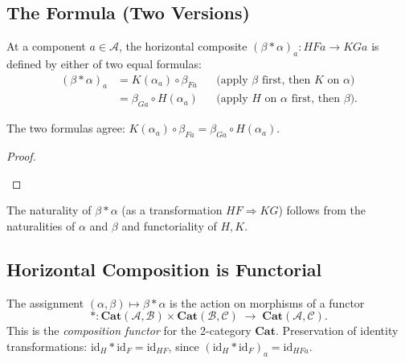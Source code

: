 \subsection{The Formula (Two Versions)}

At a component $a \in \mathcal{A}$, the horizontal composite
$(\beta * \alpha)_a : HFa \to KGa$ is defined by either of two equal
formulas:
\begin{align*}
  (\beta * \alpha)_a
    &= K(\alpha_a) \circ \beta_{Fa}
    & &\text{(apply $\beta$ first, then $K$ on $\alpha$)} \\
    &= \beta_{Ga} \circ H(\alpha_a)
    & &\text{(apply $H$ on $\alpha$ first, then $\beta$).}
\end{align*}

\begin{theorem}
The two formulas agree: $K(\alpha_a) \circ \beta_{Fa} = \beta_{Ga} \circ H(\alpha_a)$.
\end{theorem}

\begin{proof}
\begin{prooflog}
\end{prooflog}
\end{proof}

The naturality of $\beta * \alpha$ (as a transformation $HF \Rightarrow KG$)
follows from the naturalities of $\alpha$ and $\beta$ and functoriality of
$H, K$.

\subsection{Horizontal Composition is Functorial}

The assignment $(\alpha, \beta) \mapsto \beta * \alpha$ is the action on
morphisms of a functor
\[
  * : \mathbf{Cat}(\mathcal{A}, \mathcal{B}) \times
        \mathbf{Cat}(\mathcal{B}, \mathcal{C}) \;\to\;
        \mathbf{Cat}(\mathcal{A}, \mathcal{C}).
\]
This is the \emph{composition functor} for the 2-category $\mathbf{Cat}$.
Preservation of identity transformations:
$\mathrm{id}_H * \mathrm{id}_F = \mathrm{id}_{HF}$, since
$(\mathrm{id}_H * \mathrm{id}_F)_a = \mathrm{id}_{HFa}$.


